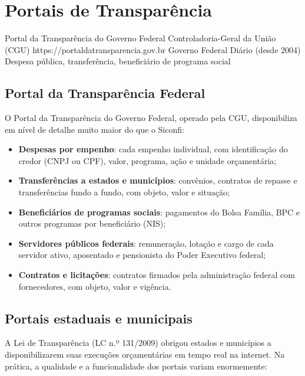 \section{Portais de Transparência}

\ficharapida
  {Portal da Transparência do Governo Federal}
  {Controladoria-Geral da União (CGU)}
  {https://portaldatransparencia.gov.br}
  {Governo Federal}
  {Diário (desde 2004)}
  {Despesa pública, transferência, beneficiário de programa social}

\subsection{Portal da Transparência Federal}

O Portal da Transparência do Governo Federal, operado pela CGU, disponibiliza em nível de detalhe muito maior do que o Siconfi:

\begin{itemize}
  \item \textbf{Despesas por empenho}: cada empenho individual, com identificação do credor (CNPJ ou CPF), valor, programa, ação e unidade orçamentária;
  \item \textbf{Transferências a estados e municípios}: convênios, contratos de repasse e transferências fundo a fundo, com objeto, valor e situação;
  \item \textbf{Beneficiários de programas sociais}: pagamentos do Bolsa Família, BPC e outros programas por beneficiário (NIS);
  \item \textbf{Servidores públicos federais}: remuneração, lotação e cargo de cada servidor ativo, aposentado e pensionista do Poder Executivo federal;
  \item \textbf{Contratos e licitações}: contratos firmados pela administração federal com fornecedores, com objeto, valor e vigência.
\end{itemize}

\subsection{Portais estaduais e municipais}

A Lei de Transparência (LC n.º 131/2009) obrigou estados e municípios a disponibilizarem suas execuções orçamentárias em tempo real na internet. Na prática, a qualidade e a funcionalidade dos portais variam enormemente:

